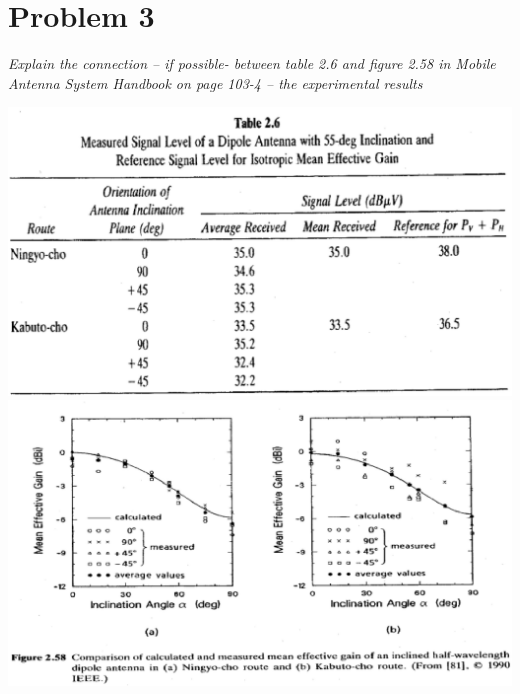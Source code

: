 \section{Problem 3}
\textit{Explain the connection – if possible- between table 2.6 and figure 2.58 in Mobile Antenna System Handbook on page 103-4 – the experimental results}\\

\begin{center}
\includegraphics[scale=0.6]{figures/Tabel_2_6.eps}\\
\includegraphics[scale=0.85]{figures/Figure_2_58.eps}
\end{center}



